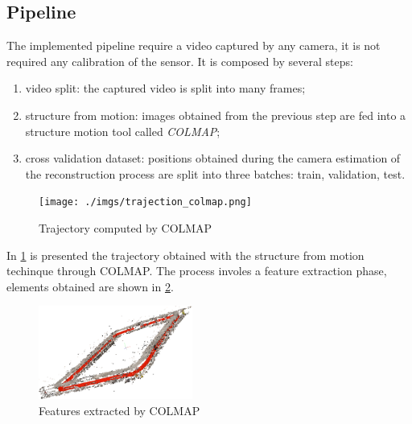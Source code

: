 \subsection{Pipeline}
The implemented pipeline require a video captured by any camera, it is not required any calibration of the sensor. It is composed by several steps:
\begin{enumerate}
    \item video split: the captured video is split into many frames; 
    \item structure from motion: images obtained from the previous step are fed into a structure motion tool called \textit{COLMAP};
    \item cross validation dataset: positions obtained during the camera estimation of the reconstruction process are split into three batches: train, validation, test.
\end{enumerate}

\begin{figure}
    \begin{center}
        \texttt{[image: ./imgs/trajection\_colmap.png]}
    \end{center}
    \caption{Trajectory computed by COLMAP}
    \label{fig:trajectory-colmap}
\end{figure}

In \cref{fig:trajectory-colmap} is presented the trajectory obtained with the structure from motion techinque through COLMAP. The process involes a feature extraction phase, elements obtained are shown in \cref{fig:features-colmap}.

\begin{figure}
    \begin{center}
        \includegraphics[width=0.45\textwidth]{./imgs/extracted_features_colmap.png}
    \end{center}
    \caption{Features extracted by COLMAP}
    \label{fig:features-colmap}
\end{figure}
